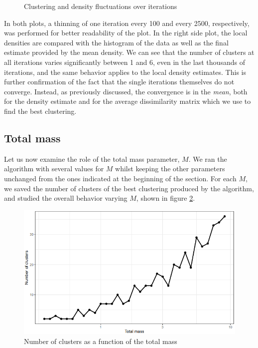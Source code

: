 \begin{figure}[h]
\begin{minipage}{0.5\textwidth}
	\end{minipage}
	\caption{Clustering and density fluctuations over iterations}

	\label{fig:fluctuations}

\end{figure}

In both plots, a thinning of one iteration every 100 and every 2500, respectively, was performed for better readability of the plot.
In the right side plot, the local densities are compared with the histogram of the data as well as the final estimate provided by the mean density.
We can see that the number of clusters at all iterations varies significantly between 1 and 6, even in the last thousands of iterations, and the same behavior applies to the local density estimates. 
This is further confirmation of the fact that the single iterations themselves do not converge.
Instead, as previously discussed, the convergence is in the \emph{mean}, both for the density estimate and for the average dissimilarity matrix which we use to find the best clustering.

\subsection{Total mass}
Let us now examine the role of the total mass parameter, $M$.
We ran the algorithm with several values for $M$ whilst keeping the other parameters unchanged from the ones indicated at the beginning of the section.
For each $M$, we saved the number of clusters of the best clustering produced by the algorithm, and studied the overall behavior varying $M$, shown in figure \ref{fig:n_clusters_M}.

\begin{figure}[h]
	\centering
	\includegraphics[scale=0.5]{etc/clusters.PNG}
	\caption{Number of clusters as a function of the total mass}

	\label{fig:n_clusters_M}

\end{figure}

